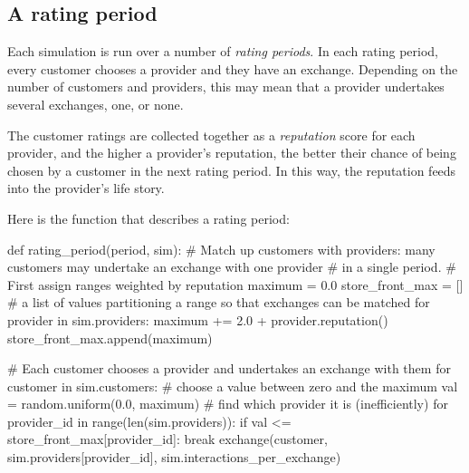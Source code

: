 \documentclass[
  letterpaper,
  DIV=11,
  numbers=noendperiod]{scrartcl}
\newenvironment{Shaded}{\begin{snugshade}}{\end{snugshade}}
\newcommand{\BuiltInTok}[1]{\textcolor[rgb]{0.00,0.23,0.31}{#1}}
\newcommand{\CommentTok}[1]{\textcolor[rgb]{0.37,0.37,0.37}{#1}}
\newcommand{\ControlFlowTok}[1]{\textcolor[rgb]{0.00,0.23,0.31}{#1}}
\newcommand{\FloatTok}[1]{\textcolor[rgb]{0.68,0.00,0.00}{#1}}
\newcommand{\KeywordTok}[1]{\textcolor[rgb]{0.00,0.23,0.31}{#1}}
\newcommand{\NormalTok}[1]{\textcolor[rgb]{0.00,0.23,0.31}{#1}}
\newcommand{\OperatorTok}[1]{\textcolor[rgb]{0.37,0.37,0.37}{#1}}
\begin{document}
\hypertarget{a-rating-period}{%
\subsection{A rating period}\label{a-rating-period}}

Each simulation is run over a number of \emph{rating periods}. In each
rating period, every customer chooses a provider and they have an
exchange. Depending on the number of customers and providers, this may
mean that a provider undertakes several exchanges, one, or none.

The customer ratings are collected together as a \emph{reputation} score
for each provider, and the higher a provider's reputation, the better
their chance of being chosen by a customer in the next rating period. In
this way, the reputation feeds into the provider's life story.

Here is the function that describes a rating period:

\begin{Shaded}
\begin{Highlighting}[]
\KeywordTok{def}\NormalTok{ rating\_period(period, sim):}
    \CommentTok{\# Match up customers with providers: many customers may undertake an exchange with one provider}
    \CommentTok{\# in a single period.}
    \CommentTok{\# First assign ranges weighted by reputation}
\NormalTok{    maximum }\OperatorTok{=} \FloatTok{0.0}
\NormalTok{    store\_front\_max }\OperatorTok{=}\NormalTok{ [] }\CommentTok{\# a list of values partitioning a range so that exchanges can be matched}
    \ControlFlowTok{for}\NormalTok{ provider }\KeywordTok{in}\NormalTok{ sim.providers:}
\NormalTok{        maximum }\OperatorTok{+=}  \FloatTok{2.0} \OperatorTok{+}\NormalTok{ provider.reputation()}
\NormalTok{        store\_front\_max.append(maximum)}
        
    \CommentTok{\# Each customer chooses a provider and undertakes an exchange with them}
    \ControlFlowTok{for}\NormalTok{ customer }\KeywordTok{in}\NormalTok{ sim.customers:}
        \CommentTok{\# choose a value between zero and the maximum}
\NormalTok{        val }\OperatorTok{=}\NormalTok{ random.uniform(}\FloatTok{0.0}\NormalTok{, maximum)}
        \CommentTok{\# find which provider it is (inefficiently)}
        \ControlFlowTok{for}\NormalTok{ provider\_id }\KeywordTok{in} \BuiltInTok{range}\NormalTok{(}\BuiltInTok{len}\NormalTok{(sim.providers)):}
            \ControlFlowTok{if}\NormalTok{ val }\OperatorTok{\textless{}=}\NormalTok{ store\_front\_max[provider\_id]:}
                \ControlFlowTok{break}
\NormalTok{        exchange(customer, }
\NormalTok{                 sim.providers[provider\_id], }
\NormalTok{                 sim.interactions\_per\_exchange)}
\end{Highlighting}
\end{Shaded}
\end{document}
